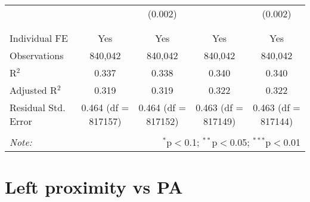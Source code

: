 \documentclass[
]{article}
\begin{document}
\begin{table}[!htbp]
{\begin{tabular}{@{\extracolsep{5pt}}lcccc}
  &  & (0.002) &  & (0.002) \\ 
  & & & & \\ 
\hline \\[-1.8ex] 
Individual FE & Yes & Yes & Yes & Yes \\ 
Observations & 840,042 & 840,042 & 840,042 & 840,042 \\ 
R$^{2}$ & 0.337 & 0.338 & 0.340 & 0.340 \\ 
Adjusted R$^{2}$ & 0.319 & 0.319 & 0.322 & 0.322 \\ 
Residual Std. Error & 0.464 (df = 817157) & 0.464 (df = 817152) & 0.463 (df = 817149) & 0.463 (df = 817144) \\ 
\hline 
\hline \\[-1.8ex] 
\textit{Note:}  & \multicolumn{4}{r}{$^{*}$p$<$0.1; $^{**}$p$<$0.05; $^{***}$p$<$0.01} \\ 
\end{tabular}
} 
\end{table} 
\newpage
\section{Left proximity vs PA}
\end{document}
